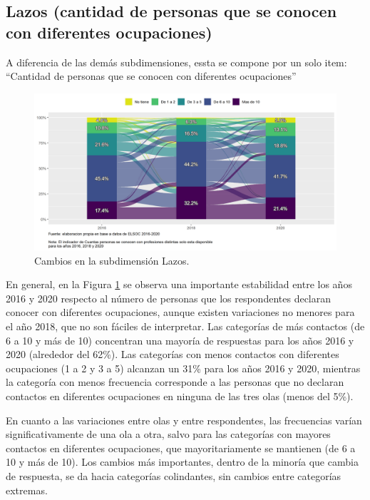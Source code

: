 \documentclass[
  12pt,
]{book}
\begin{document}
\hypertarget{lazos-cantidad-de-personas-que-se-conocen-con-diferentes-ocupaciones}{%
\subsection{Lazos (cantidad de personas que se conocen con diferentes ocupaciones)}\label{lazos-cantidad-de-personas-que-se-conocen-con-diferentes-ocupaciones}}

A diferencia de las demás subdimensiones, essta se compone por un solo item: ``Cantidad de personas que se conocen con diferentes ocupaciones''

\begin{figure}[H]

{\centering \includegraphics[width=1\linewidth,height=1\textheight]{output/graphs/alluvial_lazos} 

}

\caption{Cambios en la subdimensión Lazos.}\label{fig:alluvial-lazos}
\end{figure}

En general, en la Figura \ref{fig:alluvial-lazos} se observa una importante estabilidad entre los años 2016 y 2020 respecto al número de personas que los respondentes declaran conocer con diferentes ocupaciones, aunque existen variaciones no menores para el año 2018, que no son fáciles de interpretar. Las categorías de más contactos (de 6 a 10 y más de 10) concentran una mayoría de respuestas para los años 2016 y 2020 (alrededor del 62\%). Las categorías con menos contactos con diferentes ocupaciones (1 a 2 y 3 a 5) alcanzan un 31\% para los años 2016 y 2020, mientras la categoría con menos frecuencia corresponde a las personas que no declaran contactos en diferentes ocupaciones en ninguna de las tres olas (menos del 5\%).

En cuanto a las variaciones entre olas y entre respondentes, las frecuencias varían significativamente de una ola a otra, salvo para las categorías con mayores contactos en diferentes ocupaciones, que mayoritariamente se mantienen (de 6 a 10 y más de 10). Los cambios más importantes, dentro de la minoría que cambia de respuesta, se da hacia categorías colindantes, sin cambios entre categorías extremas.
\end{document}
